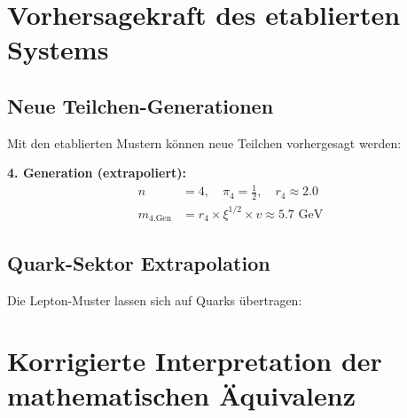	\section{Vorhersagekraft des etablierten Systems}
	\label{sec:vorhersagekraft}
	
	\subsection{Neue Teilchen-Generationen}
	\label{subsec:neue_generationen}
	
	Mit den etablierten Mustern können neue Teilchen vorhergesagt werden:
	
	\textbf{4. Generation (extrapoliert):}
	\begin{align}
		n &= 4, \quad \pi_4 = \frac{1}{2}, \quad r_4 \approx 2.0 \\
		m_{\text{4.Gen}} &= r_4 \times \xi^{1/2} \times v \approx 5.7 \text{ GeV}
	\end{align}
	
	\subsection{Quark-Sektor Extrapolation}
	\label{subsec:quark_extrapolation}
	
	Die Lepton-Muster lassen sich auf Quarks übertragen:
	
	\begin{table}[H]
		\centering
		\caption{Quark-Vorhersagen aus etablierten Mustern}
		\label{tab:quark_vorhersagen}
	\end{table}
	
	\section{Korrigierte Interpretation der mathematischen Äquivalenz}
	\label{sec:korrigierte_interpretation}
	
